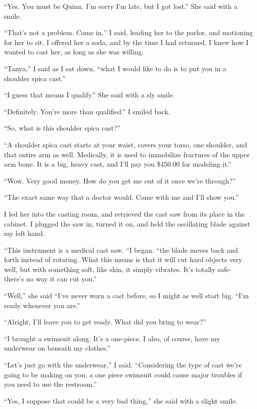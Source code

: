 ``Yes. You must be Quinn. I'm sorry I'm late, but I got lost.'' She said with a smile.

``That's not a problem. Come in,'' I said, leading her to the parlor, and motioning for her to
sit. I offered her a soda, and by the time I had returned, I knew how I wanted to cast her, as
long as she was willing.

``Tanya,'' I said as I sat down, ``what I would like to do is to put you in a shoulder spica
cast.''

``I guess that means I qualify.'' She said with a sly smile.

``Definitely. You're more than qualified.'' I smiled back.

``So, what is this shoulder spica cast?''

``A shoulder spica cast starts at your waist, covers your torso, one shoulder, and that
entire arm as well. Medically, it is used to immobilize fractures of the upper arm bone. It is a
big, heavy cast, and I'll pay you \$450.00 for modeling it.''

``Wow. Very good money. How do you get me out of it once we're through?''

``The exact same way that a doctor would. Come with me and I'll show you.''

I led her into the casting room, and retrieved the cast saw from its place in the cabinet. I
plugged the saw in, turned it on, and held the oscillating blade against my left hand.

``This instrument is a medical cast saw. ``I began. ``the blade moves back and forth instead of
rotating. What this means is that it will cut hard objects very well, but with something soft,
like skin, it simply vibrates. It's totally safe- there's no way it can cut you.''

``Well,'' she said ``I've never worn a cast before, so I might as well start big. ``I'm ready
whenever you are.''

``Alright, I'll leave you to get ready. What did you bring to wear?''

``I brought a swimsuit along. It's a one-piece. I also, of course, have my underwear on
beneath my clothes.''

``Let's just go with the underwear,'' I said. ``Considering the type of cast we're going to be
making on you, a one piece swimsuit could cause major troubles if you need to use the
restroom.''

``Yes, I suppose that could be a very bad thing,'' she said with a slight smile.

